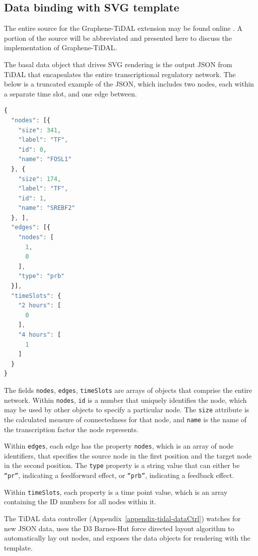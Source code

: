 \subsection{Data binding with SVG template}

The entire source for the Graphene-TiDAL extension may be found online \autocite{gu2014grapheneTidal}.
A portion of the source will be abbreviated and presented here to discuss the implementation of Graphene-TiDAL.

The basal data object that drives SVG rendering is the output JSON from TiDAL that encapsulates the entire transcriptional regulatory network. 
The below is a truncated example of the JSON, which includes two nodes, each within a separate time slot, and one edge between.

\begin{lstlisting}[language=JavaScript]
{
  "nodes": [{
    "size": 341,
    "label": "TF",
    "id": 0,
    "name": "FOSL1"
  }, {
    "size": 174,
    "label": "TF",
    "id": 1,
    "name": "SREBF2"
  }, ],
  "edges": [{
    "nodes": [
      1,
      0
    ],
    "type": "prb"
  }],
  "timeSlots": {
    "2 hours": [
      0
    ],
    "4 hours": [
      1
    ]
  }
}
\end{lstlisting}

The fields \texttt{nodes}, \texttt{edges}, \texttt{timeSlots} are arrays of objects that comprise the entire network.
Within \texttt{nodes}, \texttt{id} is a number that uniquely identifies the node, which may be used by other objects to specify a particular node. 
The \texttt{size} attribute is the calculated measure of connectedness for that node, and \texttt{name} is the name of the transcription factor the node represents.

Within \texttt{edges}, each edge has the property \texttt{nodes}, which is an array of node identifiers, that specifies the source node in the first position and the target node in the second position.
The \texttt{type} property is a string value that can either be \texttt{“pr”}, indicating a feedforward effect, or \texttt{“prb”}, indicating a feedback effect.

Within \texttt{timeSlots}, each property is a time point value, which is an array containing the ID numbers for all nodes within it.

The TiDAL data controller (Appendix~\ref{appendix-tidal-dataCtrl}) watches for new JSON data, uses the D3 Barnes-Hut force directed layout algorithm to automatically lay out nodes, and exposes the data objects for rendering with the template.

